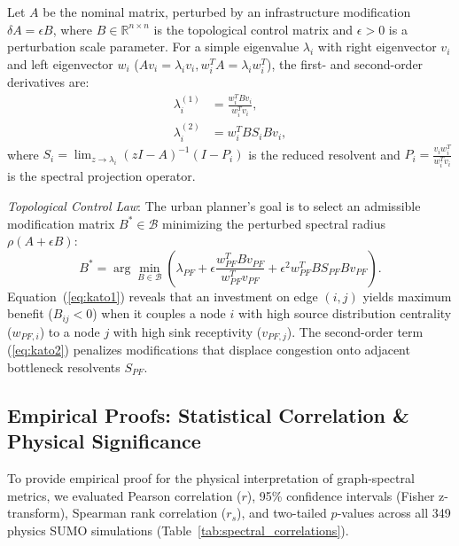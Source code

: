 \documentclass[lettersize,journal]{IEEEtran}
\begin{document}
Let $A$ be the nominal matrix, perturbed by an infrastructure modification $\delta A = \epsilon B$, where $B \in \mathbb{R}^{n \times n}$ is the topological control matrix and $\epsilon > 0$ is a perturbation scale parameter. For a simple eigenvalue $\lambda_i$ with right eigenvector $v_i$ and left eigenvector $w_i$ ($A v_i = \lambda_i v_i, w_i^T A = \lambda_i w_i^T$), the first- and second-order derivatives are:
\begin{align}
\lambda_i^{(1)} &= \frac{w_i^T B v_i}{w_i^T v_i}, \label{eq:kato1} \\
\lambda_i^{(2)} &= w_i^T B S_i B v_i, \label{eq:kato2}
\end{align}
where $S_i = \lim_{z \to \lambda_i} (zI - A)^{-1}(I - P_i)$ is the reduced resolvent and $P_i = \frac{v_i w_i^T}{w_i^T v_i}$ is the spectral projection operator.

\textit{Topological Control Law}: The urban planner's goal is to select an admissible modification matrix $B^* \in \mathcal{B}$ minimizing the perturbed spectral radius $\rho(A + \epsilon B)$:
\begin{equation}
B^* = \arg\min_{B \in \mathcal{B}} \left( \lambda_{PF} + \epsilon \frac{w_{PF}^T B v_{PF}}{w_{PF}^T v_{PF}} + \epsilon^2 w_{PF}^T B S_{PF} B v_{PF} \right).
\end{equation}
Equation~(\ref{eq:kato1}) reveals that an investment on edge $(i, j)$ yields maximum benefit ($B_{ij} < 0$) when it couples a node $i$ with high source distribution centrality ($w_{PF, i}$) to a node $j$ with high sink receptivity ($v_{PF, j}$). The second-order term (\ref{eq:kato2}) penalizes modifications that displace congestion onto adjacent bottleneck resolvents $S_{PF}$.

\subsection{Empirical Proofs: Statistical Correlation \& Physical Significance}
To provide empirical proof for the physical interpretation of graph-spectral metrics, we evaluated Pearson correlation ($r$), 95\% confidence intervals (Fisher z-transform), Spearman rank correlation ($r_s$), and two-tailed $p$-values across all 349 physics SUMO simulations (Table~\ref{tab:spectral_correlations}).
\end{document}
